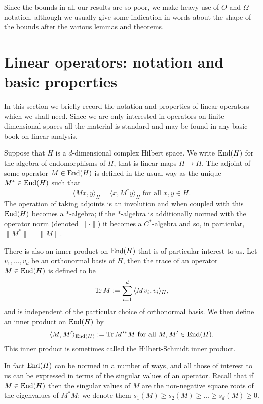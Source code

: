 \documentclass[12pt]{amsart}
\numberwithin{equation}{section}
\theoremstyle{plain}
\theoremstyle{definition}
\renewcommand{\geq}{\geqslant}
\providecommand{\Tr}{\mathop{\rm Tr}\nolimits}
\providecommand{\End}{\mathop{\rm End}\nolimits}
\begin{document}
Since the bounds in all our results are so poor, we make heavy use of $O$ and $\Omega$-notation, although we usually give some indication in words about the shape of the bounds after the various lemmas and theorems. 

\section{Linear operators: notation and basic properties}\label{sec.lon}

In this section we briefly record the notation and properties of linear operators which we shall need.  Since we are only interested in operators on finite dimensional spaces all the material is standard and may be found in any basic book on linear analysis.

Suppose that $H$ is a $d$-dimensional complex Hilbert space.  We write $\End(H)$ for the algebra of endomorphisms of $H$, that is linear maps $H \rightarrow H$.  The adjoint of some operator $M \in \End(H)$ is defined in the usual way as the unique $M^*\in \End(H)$ such that
\begin{equation*}
\langle Mx,y\rangle_H = \langle x,M^*y\rangle_H \textrm{ for all } x,y \in H.
\end{equation*}
The operation of taking adjoints is an involution and when coupled with this $\End(H)$ becomes a $*$-algebra; if the $*$-algebra is additionally normed with the operator norm (denoted $\|\cdot\|$) it becomes a $C^*$-algebra and so, in particular, $\|M^*\|=\|M\|$.

There is also an inner product on $\End(H)$ that is of particular interest to us.  Let $v_1,\dots,v_d$ be an orthonormal basis of $H$, then the trace of an operator $M \in \End(H)$ is defined to be
\begin{equation*}
\Tr M:=\sum_{i=1}^d{\langle Mv_i,v_i\rangle_H},
\end{equation*}
and is independent of the particular choice of orthonormal basis.  We then define an inner product on $\End(H)$ by
\begin{equation*}
\langle M,M' \rangle_{\End(H)}:=\Tr M'^*M \textrm{ for all } M,M' \in \End(H).
\end{equation*}
This inner product is sometimes called the Hilbert-Schmidt inner product.

In fact $\End(H)$ can be normed in a number of ways, and all those of interest to us can be expressed in terms of the singular values of an operator.  Recall that if $M \in \End(H)$ then the singular values of $M$ are the non-negative square roots of the eigenvalues of $M^*M$; we denote them $s_1(M) \geq s_2(M)\geq \dots\geq s_d(M)\geq 0$.
\end{document}

